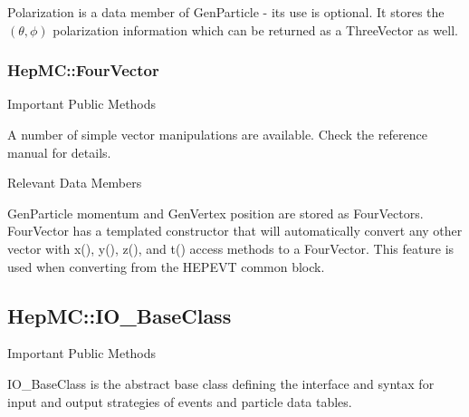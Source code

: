 \documentclass[11pt,letterpaper]{article}
\begin{document}
Polarization is a data member of GenParticle - its use is
optional. It stores the $(\theta,\phi)$ polarization information which
can be returned as a ThreeVector as well.

%
%

\subsubsection{HepMC::FourVector}
\begin{myitemize}{Important Public Methods}
  \item A number of simple vector manipulations are available.
          Check the reference manual for details.
\end{myitemize}
\begin{myitemize}{Relevant Data Members}
\end{myitemize}

GenParticle momentum and GenVertex position are stored as FourVectors.
FourVector has a templated constructor that will automatically convert 
any other vector with x(), y(), z(), and t() access methods to a FourVector.
This feature is used when converting from the HEPEVT common block.

%
%

\subsection{HepMC::IO\_BaseClass}
\begin{myitemize}{Important Public Methods}
\end{myitemize}

IO\_BaseClass is the abstract base class defining the interface and
syntax for input and output strategies of events and particle data tables.
\end{document}
